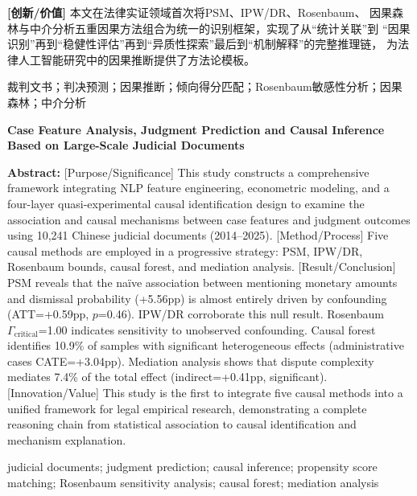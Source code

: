 \documentclass[12pt,a4paper,twoside]{ctexart}
\begin{document}
\noindent
{\bfseries [创新/价值]} 本文在法律实证领域首次将PSM、IPW/DR、Rosenbaum、
因果森林与中介分析五重因果方法组合为统一的识别框架，实现了从``统计关联''到
``因果识别''再到``稳健性评估''再到``异质性探索''最后到``机制解释''的完整推理链，
为法律人工智能研究中的因果推断提供了方法论模板。

\vspace{12pt}
裁判文书；判决预测；因果推断；倾向得分匹配；Rosenbaum敏感性分析；因果森林；中介分析

\vspace{6pt}
\begin{center}
{\bfseries\fontsize{12pt}{16pt}\selectfont
Case Feature Analysis, Judgment Prediction and Causal Inference\\
Based on Large-Scale Judicial Documents}
\end{center}

\noindent
{\bfseries Abstract:} [Purpose/Significance] This study constructs a comprehensive
framework integrating NLP feature engineering, econometric modeling, and a four-layer
quasi-experimental causal identification design to examine the association and causal
mechanisms between case features and judgment outcomes using 10,241 Chinese judicial
documents (2014--2025). [Method/Process] Five causal methods are employed in a
progressive strategy: PSM, IPW/DR, Rosenbaum bounds, causal forest, and mediation
analysis. [Result/Conclusion] PSM reveals that the na\"ive association between
mentioning monetary amounts and dismissal probability (+5.56pp) is almost entirely
driven by confounding (ATT=+0.59pp, $p$=0.46). IPW/DR corroborate this null result.
Rosenbaum $\Gamma_{\text{critical}}$=1.00 indicates sensitivity to unobserved
confounding. Causal forest identifies 10.9\% of samples with significant heterogeneous
effects (administrative cases CATE=+3.04pp). Mediation analysis shows that dispute
complexity mediates 7.4\% of the total effect (indirect=+0.41pp, significant).
[Innovation/Value] This study is the first to integrate five causal methods into a
unified framework for legal empirical research, demonstrating a complete reasoning
chain from statistical association to causal identification and mechanism explanation.

\vspace{6pt}
 judicial documents; judgment prediction; causal inference;
propensity score matching; Rosenbaum sensitivity analysis; causal forest; mediation analysis

\newpage
\setcounter{page}{1}
\end{document}

